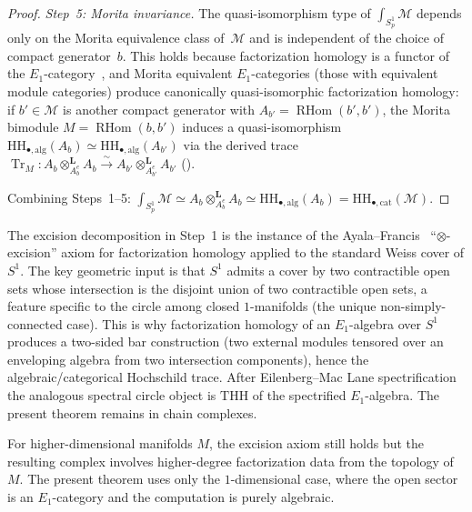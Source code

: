 \begin{proof}
\medskip
\noindent\textit{Step~5: Morita invariance.}
The quasi-isomorphism type of $\int_{S^1_p} \mathcal{M}$
depends only on the Morita equivalence class
of~$\mathcal{M}$ and is independent of the choice of compact
generator~$b$.
This holds because factorization homology is a functor of the
$E_1$-category~\cite[Theorem~3.19]{AF15}, and Morita equivalent
$E_1$-categories (those with equivalent module categories)
produce canonically quasi-isomorphic factorization homology:
if $b' \in \mathcal{M}$ is another compact generator with
$A_{b'} = \operatorname{RHom}(b', b')$, the Morita bimodule
$M = \operatorname{RHom}(b, b')$ induces a quasi-isomorphism
$\mathrm{HH}_{\bullet,\mathrm{alg}}(A_b)
\simeq \mathrm{HH}_{\bullet,\mathrm{alg}}(A_{b'})$ via the derived trace
$\operatorname{Tr}_M\colon
A_b \otimes_{A_b^e}^{\mathbf{L}} A_b
\xrightarrow{\sim}
A_{b'} \otimes_{A_{b'}^e}^{\mathbf{L}} A_{b'}$
(\cite[Theorem~1.2]{Keller06}).

Combining Steps~1--5:
$\int_{S^1_p} \mathcal{M}
\simeq A_b \otimes_{A_b^e}^{\mathbf{L}} A_b
\simeq \mathrm{HH}_{\bullet,\mathrm{alg}}(A_b)
= \mathrm{HH}_{\bullet,\mathrm{cat}}(\mathcal{M})$.
\end{proof}

\begin{remark}
\label{rem:thqg-annulus-excision-principle}
The excision decomposition in Step~1 is the instance of the
Ayala--Francis~\cite{AF15} ``$\otimes$-excision'' axiom for
factorization homology applied to the standard Weiss cover of
$S^1$. The key geometric input is that $S^1$ admits a cover by
two contractible open sets whose intersection is the disjoint
union of two contractible open sets, a feature specific to the
circle among closed $1$-manifolds (the unique non-simply-connected
case). This is why factorization homology of an $E_1$-algebra
over $S^1$ produces a two-sided bar construction (two external
modules tensored over an enveloping algebra from two intersection
components), hence the algebraic/categorical Hochschild trace.
After Eilenberg--Mac Lane spectrification the analogous spectral
circle object is $\mathrm{THH}$ of the spectrified $E_1$-algebra.
The present theorem remains in chain complexes.

For higher-dimensional manifolds $M$, the excision axiom still
holds but the resulting complex involves higher-degree factorization
data from the topology of $M$. The present theorem uses only the
$1$-dimensional case, where the open sector is an $E_1$-category
and the computation is purely algebraic.
\end{remark}

